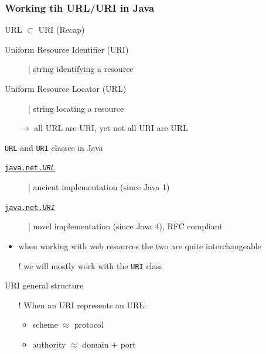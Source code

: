 \documentclass[presentation]{beamer}\mode<presentation>{\usetheme{AMSCesenaPurpleAndGold}}
\begin{document}
\begin{frame}[allowframebreaks]
    \frametitle{Working tih URL/URI in Java}

    \begin{block}{URL $\subset$ URI (Recap)}
        \begin{description}
            \item[Uniform Resource Identifier (URI)] | string \alert{identifying} a resource
            \item[Uniform Resource Locator (URL)] | string \alert{locating} a resource
        \end{description}
        \begin{itemize}
            \item[$\rightarrow$] all URL are URI, yet not all URI are URL
        \end{itemize}
    \end{block}

    \begin{block}{\texttt{URL} and \texttt{URI} classes in Java}
        \begin{description}
            \item[\href{https://docs.oracle.com/en/java/javase/15/docs/api/java.base/java/net/URL.html}{\texttt{java.net.\textit{URL}}}] | ancient implementation (since Java 1)
            \item[\href{https://docs.oracle.com/en/java/javase/15/docs/api/java.base/java/net/URI.html}{\texttt{java.net.\textit{URI}}}] | novel implementation (since Java 4), RFC compliant
        \end{description}
        \begin{itemize}
            \item when working with web resources the two are quite interchangeable
            \item[!] we will mostly work with the \texttt{URI} class
        \end{itemize}
    \end{block}

    \begin{block}{URI general structure}
        \begin{center}\ttfamily
            [scheme:][//authority][path][?query][\#fragment]
        \end{center}

        \begin{itemize}
            \item[!] When an URI represents an URL:
            \begin{itemize}
                \item scheme $\approx$ protocol
                \item authority $\approx$ domain + port
            \end{itemize}
        \end{itemize}
    \end{block}


\end{frame}
\end{document}
